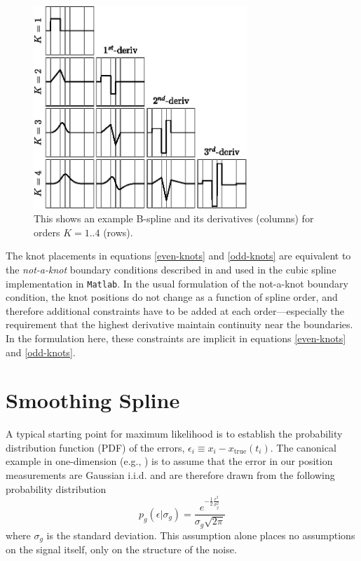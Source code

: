 \documentclass[10pt,journal]{IEEEtran}
\begin{document}
\begin{figure}
  \centerline{\includegraphics[width=19pc,angle=0]{figures/bsplines}}
  \caption{This shows an example B-spline and its derivatives (columns) for orders $K=1..4$ (rows).}
  \label{bsplines}
\end{figure}

The knot placements in equations \ref{even-knots} and \ref{odd-knots} are equivalent to the \textit{not-a-knot} boundary conditions described in \cite{deboor1978-book} and used in the cubic spline implementation in \texttt{Matlab}. In the usual formulation of the not-a-knot boundary condition, the knot positions do not change as a function of spline order, and therefore additional constraints have to be added at each order---especially the requirement that the highest derivative maintain continuity near the boundaries. In the formulation here, these constraints are implicit in equations \ref{even-knots} and \ref{odd-knots}.


%
\section{Smoothing Spline}
\label{sec:maximum_likelihood}
%

A typical starting point for maximum likelihood is to establish the probability distribution function (PDF) of the errors, $\epsilon_i \equiv x_i - x_{\textrm{true}}(t_i)$. The canonical example in one-dimension (e.g., \cite{press1992-book}) is to assume that the error in our position measurements are Gaussian i.i.d. and are therefore drawn from the following probability distribution
\begin{equation}
\label{gaussian_pdf}
p_g(\epsilon|\sigma_g) = \frac{e^{-\frac{1}{2}\frac{\epsilon^2}{\sigma_g^2}} }{\sigma_g \sqrt{ 2 \pi}}
\end{equation}
where $\sigma_g$ is the standard deviation. This assumption alone places no assumptions on the signal itself, only on the structure of the noise.
\end{document}
